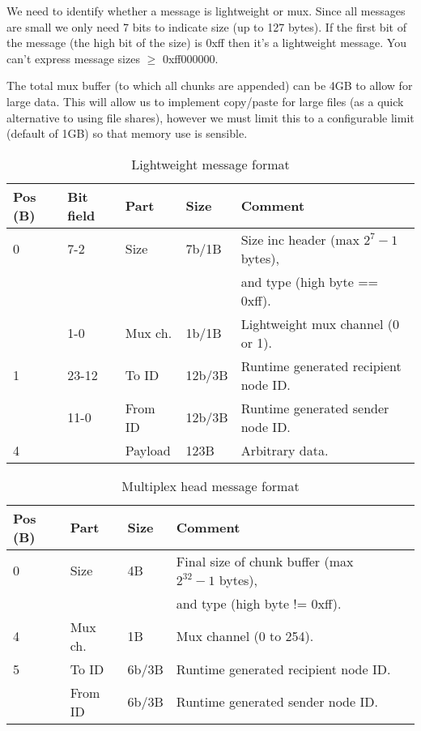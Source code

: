 We need to identify whether a message is lightweight or mux. Since all
messages are small we only need 7 bits to indicate size (up to 127 bytes).
If the first bit of the message (the high bit of the size) is 0xff then 
it's a lightweight message. You can't express message sizes $\geq$ 0xff000000.

The total mux buffer (to which all chunks are appended) can be 4GB to allow 
for large data. This will allow us to implement copy/paste for large files
(as a quick alternative to using file shares), however we must limit this
to a configurable limit (default of 1GB) so that memory use is sensible.

\begin{table}[ht!]
  \begin{tabular}{|l|l|l|l|l|}
    \hline
    \textbf{Pos (B)} &
    \textbf{Bit field} &
    \textbf{Part} &
    \textbf{Size} &
    \textbf{Comment} \\
    \hline
    0 & 7-2 & Size & 7b/1B & Size inc header (max $2^7-1$ bytes), \\
      &     &      &       & and type (high byte == 0xff). \\
      & 1-0 & Mux ch. & 1b/1B & Lightweight mux channel (0 or 1). \\
    1 & 23-12 & To ID & 12b/3B & Runtime generated recipient node ID. \\
      & 11-0 & From ID & 12b/3B & Runtime generated sender node ID. \\
    4 & & Payload & 123B & Arbitrary data. \\
    \hline
  \end{tabular}
  \caption{Lightweight message format}
  \label{tab:lightMessage}
\end{table}

\begin{table}[ht!]
  \begin{tabular}{|l|l|l|l|l|}
    \hline
    \textbf{Pos (B)} &
    \textbf{Part} &
    \textbf{Size} &
    \textbf{Comment} \\
    \hline
    0 & Size & 4B & Final size of chunk buffer (max $2^{32}-1$ bytes), \\ 
      &      &    & and type (high byte != 0xff). \\
    4 & Mux ch. & 1B & Mux channel (0 to 254). \\
    5 & To ID & 6b/3B & Runtime generated recipient node ID. \\
      & From ID & 6b/3B & Runtime generated sender node ID. \\
    \hline
  \end{tabular}
  \caption{Multiplex head message format}
  \label{tab:muxHeadMessage}
\end{table}

